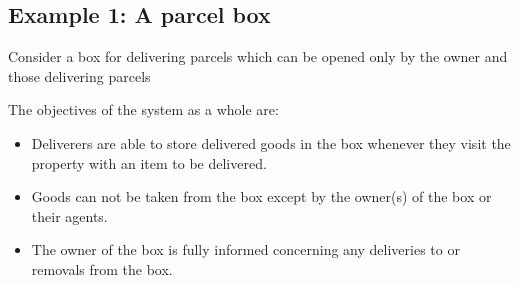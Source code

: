 \subsection{Example 1: A parcel box}\label{exm1}

Consider a box for delivering parcels which can be opened only by the owner and those delivering parcels

The objectives of the system as a whole are:
\begin{itemize}
\item Deliverers are able to store delivered goods in the box whenever they visit the
property with an item to be delivered.
\item Goods can not be taken from the box except by the owner(s) of the box or their agents.
\item The owner of the box is fully informed concerning any deliveries to or removals
from the box.
\end{itemize}


